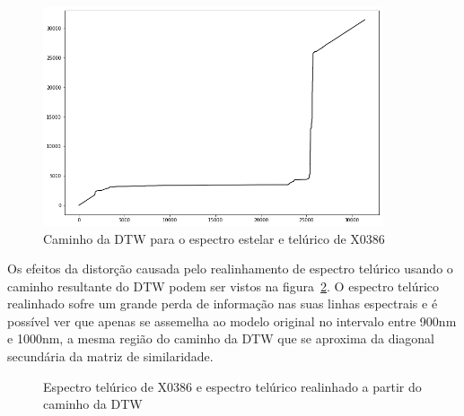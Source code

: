 \begin{figure}[htb]
\centering
\includegraphics[width=10cm]{figuras/x0386_warp_path.png}
\caption{Caminho da DTW para o espectro estelar e telúrico de X0386}
\label{fig:x0386-warp-path}
\end{figure}

Os efeitos da distorção causada pelo realinhamento de espectro telúrico usando o caminho resultante do DTW podem ser vistos na figura~\ref{fig:x0386-realigned-telluric}. O espectro telúrico realinhado sofre um grande perda de informação nas suas linhas espectrais e é possível ver que apenas se assemelha ao modelo original no intervalo entre 900nm e 1000nm, a mesma região do caminho da DTW que se aproxima da diagonal secundária da matriz de similaridade.

\begin{figure}[H]
  \centering
  \hfill
  \caption{Espectro telúrico de X0386 e espectro telúrico realinhado a partir do caminho da DTW}
  \label{fig:x0386-realigned-telluric}
\end{figure}



